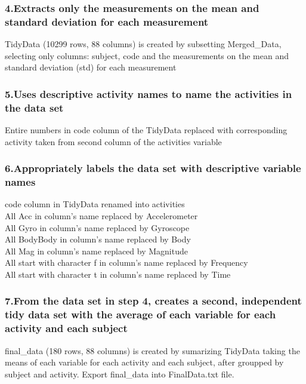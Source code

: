 \documentclass[
]{article}
\begin{document}
\hypertarget{extracts-only-the-measurements-on-the-mean-and-standard-deviation-for-each-measurement}{%
\subsubsection{4.Extracts only the measurements on the mean and standard
deviation for each
measurement}\label{extracts-only-the-measurements-on-the-mean-and-standard-deviation-for-each-measurement}}

TidyData (10299 rows, 88 columns) is created by subsetting Merged\_Data,
selecting only columns: subject, code and the measurements on the mean
and standard deviation (std) for each measurement

\hypertarget{uses-descriptive-activity-names-to-name-the-activities-in-the-data-set}{%
\subsubsection{5.Uses descriptive activity names to name the activities
in the data
set}\label{uses-descriptive-activity-names-to-name-the-activities-in-the-data-set}}

Entire numbers in code column of the TidyData replaced with
corresponding activity taken from second column of the activities
variable

\hypertarget{appropriately-labels-the-data-set-with-descriptive-variable-names}{%
\subsubsection{6.Appropriately labels the data set with descriptive
variable
names}\label{appropriately-labels-the-data-set-with-descriptive-variable-names}}

code column in TidyData renamed into activities\\
All Acc in column's name replaced by Accelerometer\\
All Gyro in column's name replaced by Gyroscope\\
All BodyBody in column's name replaced by Body\\
All Mag in column's name replaced by Magnitude\\
All start with character f in column's name replaced by Frequency\\
All start with character t in column's name replaced by Time\\

\hypertarget{from-the-data-set-in-step-4-creates-a-second-independent-tidy-data-set-with-the-average-of-each-variable-for-each-activity-and-each-subject}{%
\subsubsection{7.From the data set in step 4, creates a second,
independent tidy data set with the average of each variable for each
activity and each
subject}\label{from-the-data-set-in-step-4-creates-a-second-independent-tidy-data-set-with-the-average-of-each-variable-for-each-activity-and-each-subject}}

final\_data (180 rows, 88 columns) is created by sumarizing TidyData
taking the means of each variable for each activity and each subject,
after groupped by subject and activity. Export final\_data into
FinalData.txt file.
\end{document}
